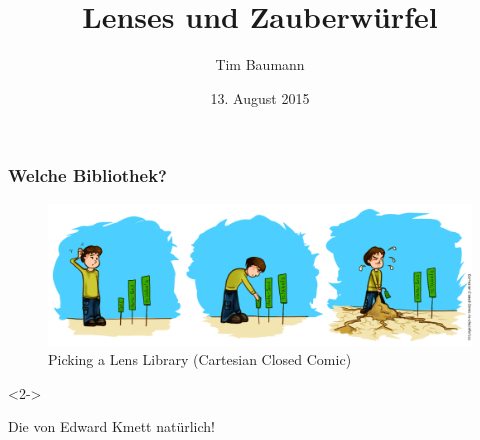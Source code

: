 \documentclass{beamer}
\title[Lens]{Lenses und Zauberwürfel}
\author{Tim Baumann}
\institute[CCA]{Curry Club Augsburg}
\date{13. August 2015}
\begin{document}
\begin{frame}
  \titlepage
\end{frame}

\begin{frame}[fragile,t]
  \frametitle{Welche Bibliothek?}
  \begin{figure}
    \includegraphics[width=0.9\linewidth]{images/ccc-picking-lens-library.png}
    \caption{Picking a Lens Library (Cartesian Closed Comic)}
  \end{figure}
  \begin{visibleenv}<2->
    \begin{center}
      \begin{minipage}{0.65\textwidth}
        Die von Edward Kmett natürlich! %

         \\
         \\
         \\
         \\
      \end{minipage}
    \end{center}
  \end{visibleenv}
\end{frame}
\end{document}
